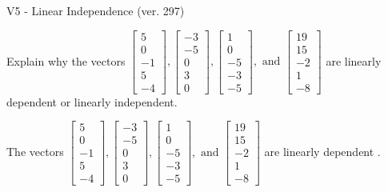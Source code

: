 \begin{exercise}
  \begin{exerciseTitle}V5 - Linear Independence (ver. 297)\end{exerciseTitle}
  \begin{exerciseStatement}
    Explain why the vectors \(\left[\begin{array}{r}
5 \\
0 \\
-1 \\
5 \\
-4
\end{array}\right] , \left[\begin{array}{r}
-3 \\
-5 \\
0 \\
3 \\
0
\end{array}\right] , \left[\begin{array}{r}
1 \\
0 \\
-5 \\
-3 \\
-5
\end{array}\right] , \text{ and } \left[\begin{array}{r}
19 \\
15 \\
-2 \\
1 \\
-8
\end{array}\right]\) are linearly dependent or linearly independent.	


  \end{exerciseStatement}
  \begin{exerciseAnswer}
   The vectors \(\left[\begin{array}{r}
5 \\
0 \\
-1 \\
5 \\
-4
\end{array}\right] , \left[\begin{array}{r}
-3 \\
-5 \\
0 \\
3 \\
0
\end{array}\right] , \left[\begin{array}{r}
1 \\
0 \\
-5 \\
-3 \\
-5
\end{array}\right] , \text{ and } \left[\begin{array}{r}
19 \\
15 \\
-2 \\
1 \\
-8
\end{array}\right]\) are 
  	 linearly dependent  .
  


  \end{exerciseAnswer}
\end{exercise}